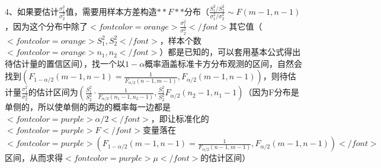 4、如果要估计$ \frac{\sigma_{1}^{2}}{\sigma_{2}^{2}} $值，需要用样本方差构造$ **F** $分布（$ \frac{S_{1}^{2} / S_{2}^{2}}{\sigma_{1}^{2} / \sigma_{2}^{2}} \sim F\left(m-1, n-1\right) $，因为这个分布中除了$ <font color=orange>\frac{\sigma_{1}^{2}}{\sigma_{2}^{2}}</font> $其它值（$ <font color=orange>S_{1}^{2},S_{2}^{2}</font> $，样本个数$ <font color=orange>n_1,n_2</font> $）都是已知的，可以套用基本公式得出待估计量的置信区间），找一个以$ 1−α $概率涵盖标准卡方分布观测的区间，自然会找到$ (F_{1-\alpha/2}(m−1,n−1)=\frac{1}{F_{{\alpha}/{2}}\left(n−1, m−1\right)},F_{\alpha/2}(m−1,n−1)) $，则待估计量$ \frac{\sigma_{1}^{2}}{\sigma_{2}^{2}} $的估计区间为$ \left(\frac{S_{1}^{2}}{S_{2}^{2}} \cdot \frac{1}{F_{{\alpha}/{2}}\left(n_{1}-1, n_{2}-1\right)}, \frac{S_{1}^{2}}{S_{2}^{2}} F_{{\alpha}/{2}}\left(n_{2}-1, n_{1}-1\right.\right) $（因为F分布是单侧的，所以使单侧的两边的概率每一边都是$ <font color=purple>\alpha/2</font> $，即让标准化的$ <font color=purple>F</font> $变量落在$ <font color=purple>(F_{1-\alpha/2}(m−1,n−1)=\frac{1}{F_{{\alpha}/{2}}\left(n−1, m−1\right)},F_{\alpha/2}(m−1,n−1))</font> $区间，从而求得$ <font color=purple>\mu</font> $的估计区间）

